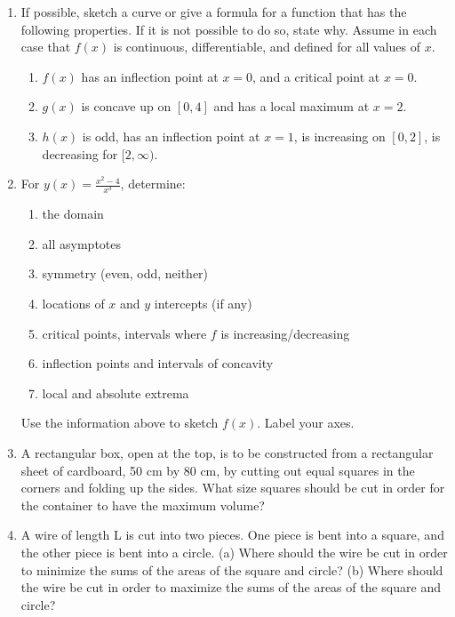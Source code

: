 \begin{enumerate}
	\item If possible, sketch a curve or give a formula for a function that has the following properties. If it is not possible to do so, state why. Assume in each case that $f(x)$ is continuous, differentiable, and defined for all values of $x$. 
    
    \begin{enumerate}
        \item $f(x)$ has an inflection point at $x=0$, and a critical point at $x=0$. 
        \item $g(x)$ is concave up on $[0,4]$ and has a local maximum at $x=2$. 
        \item $h(x)$ is odd, has an inflection point at $x=1$, is increasing on $[0,2]$, is decreasing for $[2,\infty)$. 
    \end{enumerate}
    
    \item  For $\displaystyle y(x) = \frac{x^2 - 4}{x^3} $, determine:
   	\begin{enumerate}
       \item the domain 
       \item all asymptotes
       \item symmetry (even, odd, neither)
       \item locations of $x$ and $y$ intercepts (if any)
       \item critical points, intervals where $f$ is increasing/decreasing
       \item inflection points and intervals of concavity
       \item local and absolute extrema
   	\end{enumerate}
   	Use the information above to sketch $f(x)$. Label your axes.

	\item A rectangular box, open at the top, is to be constructed from a rectangular sheet of cardboard, 50 cm by 80 cm, by cutting out equal squares in the corners and folding up the sides. What size squares should be cut in order for the container to have the maximum volume?
    
    
    \item A wire of length L is cut into two pieces. One piece is bent into a square, and the other piece is bent into a circle.
(a) Where should the wire be cut in order to minimize the sums of the areas of the square and circle?
(b) Where should the wire be cut in order to maximize the sums of the areas of the square and circle?
    
\end{enumerate}    